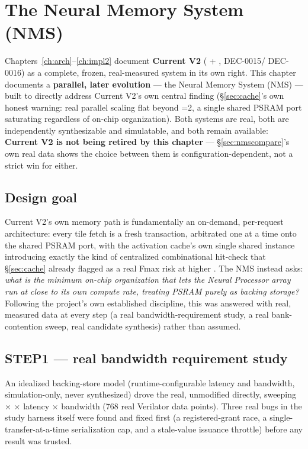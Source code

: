 \chapter{The Neural Memory System (NMS)}
\label{ch:nms}

\begin{fnnote}
Chapters~\ref{ch:arch}--\ref{ch:impl2} document \textbf{Current V2}
( + , DEC-0015/
DEC-0016) as a complete, frozen, real-measured system in its own
right. This chapter documents a \textbf{parallel, later evolution} ---
the Neural Memory System (NMS) --- built to directly address Current
V2's own central finding (\S\ref{sec:cache}'s own honest warning:
real parallel scaling flat beyond =2, a single shared
PSRAM port saturating regardless of on-chip organization). Both
systems are real, both are independently synthesizable and
simulatable, and both remain available: \textbf{Current V2 is not
being retired by this chapter} --- \S\ref{sec:nmscompare}'s own real
data shows the choice between them is configuration-dependent, not a
strict win for either.
\end{fnnote}

\section{Design goal}
Current V2's own memory path is fundamentally an on-demand,
per-request architecture: every tile fetch is a fresh transaction,
arbitrated one at a time onto the shared PSRAM port, with the
activation cache's own single shared instance introducing exactly the
kind of centralized combinational hit-check that \S\ref{sec:cache}
already flagged as a real Fmax risk at higher . The
NMS instead asks: \emph{what is the minimum on-chip organization that
lets the Neural Processor array run at close to its own compute rate,
treating PSRAM purely as backing storage?} Following the project's own
established discipline, this was answered with real, measured data at
every step (a real bandwidth-requirement study, a real bank-contention
sweep, real candidate synthesis) rather than assumed.

\section{STEP1 --- real bandwidth requirement study}
\label{sec:nmsstep1}
An idealized backing-store model (runtime-configurable latency and
bandwidth, simulation-only, never synthesized) drove the real,
unmodified  directly, sweeping 
$\times$  $\times$ latency $\times$ bandwidth (768
real Verilator data points). Three real bugs in the study harness
itself were found and fixed first (a registered-grant race, a
single-transfer-at-a-time serialization cap, and a stale-value
issuance throttle) before any result was trusted.

